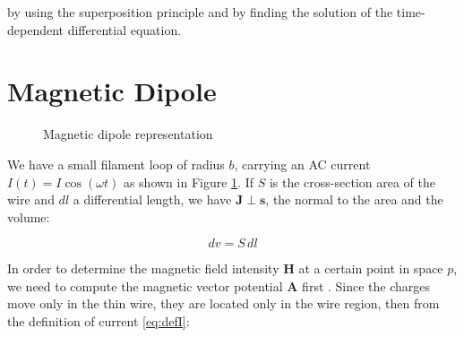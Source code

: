 by using the superposition principle and by finding the 
solution of the time-dependent differential equation.

\section{Magnetic Dipole}

\begin{figure}
    \centering
    \caption{Magnetic dipole representation}
    \label{fig:dipole}
\end{figure}

We have a small filament loop of radius \( b \), 
carrying an AC current \( I(t) = I \cos(\omega t) \) 
as shown in Figure \ref{fig:dipole}. If \( S \) is the 
cross-section area of the wire and \( dl \) a 
differential length, we have \( \mathbf{J} \perp 
\mathbf{s} \), the normal to the area and the volume:

\[
    dv = S \, dl
\]

In order to determine the magnetic field intensity 
\(\mathbf{H}\) at a certain point in space \( p \), 
we need to compute the magnetic vector potential 
\(\mathbf{A}\) first \cite{book-magnetism}. Since the 
charges move only in the thin wire, they are located 
only in the wire region, then from the definition of 
current \ref{eq:defI}:

